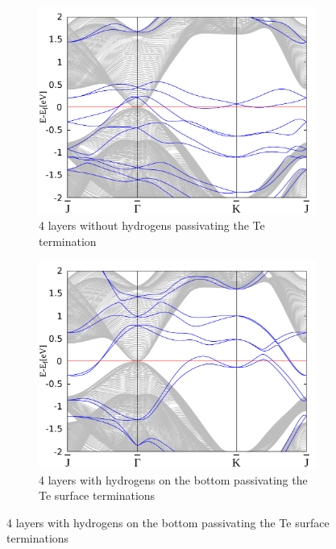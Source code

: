 	\begin{figure}[htbp]
		\begin{subfigure}[c]{.48\linewidth}
			\centering
			\includegraphics[width=\linewidth]{Te_and_Hg_termination/no_H_bulk+4_layers_no_dos_-2_2.pdf}
			\caption{4 layers without hydrogens passivating the Te termination}
		\end{subfigure}
		\hfill
		\begin{subfigure}[c]{.48\linewidth}
			\centering
			\includegraphics[width=\linewidth]{Te_and_Hg_termination/bulk+4_layers_no_dos_-2_2.pdf}
			\caption{4 layers with hydrogens on the bottom passivating the Te surface terminations}
		\end{subfigure}

\end{figure}
